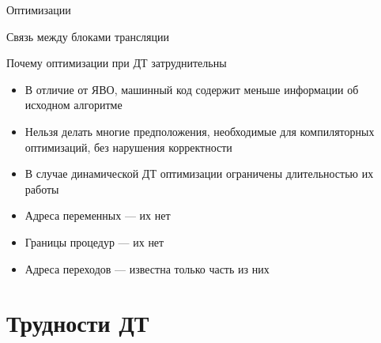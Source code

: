 \documentclass{beamer}
\begin{document}
\begin{frame}{Оптимизации}
\centering


\end{frame}

\begin{frame}{Связь между блоками трансляции}
\centering

\end{frame}

\begin{frame}{Почему оптимизации при ДТ затруднительны}

\begin{itemize}
    \item В отличие от ЯВО, машинный код содержит меньше информации об исходном алгоритме
    \item Нельзя делать многие предположения, необходимые для компиляторных оптимизаций, без нарушения корректности
    \item В случае динамической ДТ оптимизации ограничены длительностью их работы
\end{itemize}\pause

\begin{itemize}
\item Адреса переменных — их нет
\item Границы процедур — их нет
\item Адреса переходов — известна только часть из них
\end{itemize}


\end{frame}

\section{Трудности ДТ}
\end{document}
